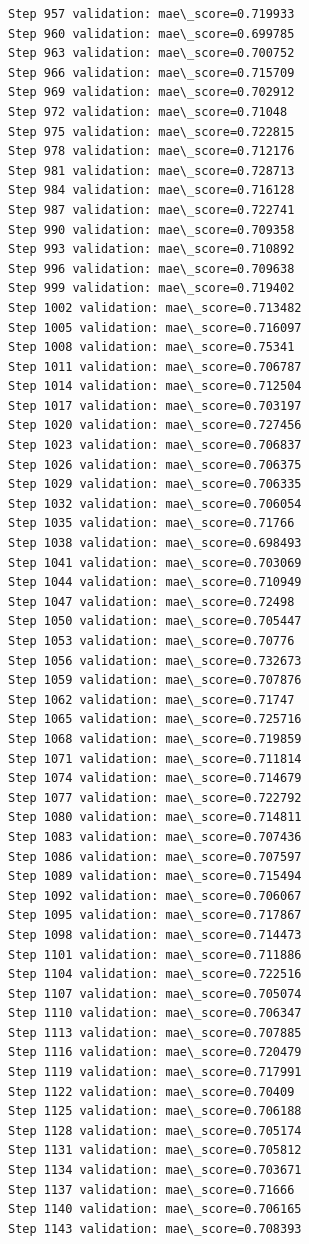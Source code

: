 \documentclass[11pt]{article}
\begin{document}
\begin{Verbatim}[commandchars=\\\{\}]
Step 957 validation: mae\_score=0.719933
Step 960 validation: mae\_score=0.699785
Step 963 validation: mae\_score=0.700752
Step 966 validation: mae\_score=0.715709
Step 969 validation: mae\_score=0.702912
Step 972 validation: mae\_score=0.71048
Step 975 validation: mae\_score=0.722815
Step 978 validation: mae\_score=0.712176
Step 981 validation: mae\_score=0.728713
Step 984 validation: mae\_score=0.716128
Step 987 validation: mae\_score=0.722741
Step 990 validation: mae\_score=0.709358
Step 993 validation: mae\_score=0.710892
Step 996 validation: mae\_score=0.709638
Step 999 validation: mae\_score=0.719402
Step 1002 validation: mae\_score=0.713482
Step 1005 validation: mae\_score=0.716097
Step 1008 validation: mae\_score=0.75341
Step 1011 validation: mae\_score=0.706787
Step 1014 validation: mae\_score=0.712504
Step 1017 validation: mae\_score=0.703197
Step 1020 validation: mae\_score=0.727456
Step 1023 validation: mae\_score=0.706837
Step 1026 validation: mae\_score=0.706375
Step 1029 validation: mae\_score=0.706335
Step 1032 validation: mae\_score=0.706054
Step 1035 validation: mae\_score=0.71766
Step 1038 validation: mae\_score=0.698493
Step 1041 validation: mae\_score=0.703069
Step 1044 validation: mae\_score=0.710949
Step 1047 validation: mae\_score=0.72498
Step 1050 validation: mae\_score=0.705447
Step 1053 validation: mae\_score=0.70776
Step 1056 validation: mae\_score=0.732673
Step 1059 validation: mae\_score=0.707876
Step 1062 validation: mae\_score=0.71747
Step 1065 validation: mae\_score=0.725716
Step 1068 validation: mae\_score=0.719859
Step 1071 validation: mae\_score=0.711814
Step 1074 validation: mae\_score=0.714679
Step 1077 validation: mae\_score=0.722792
Step 1080 validation: mae\_score=0.714811
Step 1083 validation: mae\_score=0.707436
Step 1086 validation: mae\_score=0.707597
Step 1089 validation: mae\_score=0.715494
Step 1092 validation: mae\_score=0.706067
Step 1095 validation: mae\_score=0.717867
Step 1098 validation: mae\_score=0.714473
Step 1101 validation: mae\_score=0.711886
Step 1104 validation: mae\_score=0.722516
Step 1107 validation: mae\_score=0.705074
Step 1110 validation: mae\_score=0.706347
Step 1113 validation: mae\_score=0.707885
Step 1116 validation: mae\_score=0.720479
Step 1119 validation: mae\_score=0.717991
Step 1122 validation: mae\_score=0.70409
Step 1125 validation: mae\_score=0.706188
Step 1128 validation: mae\_score=0.705174
Step 1131 validation: mae\_score=0.705812
Step 1134 validation: mae\_score=0.703671
Step 1137 validation: mae\_score=0.71666
Step 1140 validation: mae\_score=0.706165
Step 1143 validation: mae\_score=0.708393

\end{Verbatim}
\end{document}
